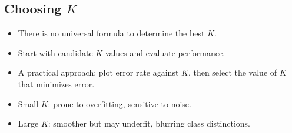 \documentclass[11pt]{article}
\begin{document}
\subsection*{Choosing $K$}
\begin{itemize}
    \item There is no universal formula to determine the best $K$.
    \item Start with candidate $K$ values and evaluate performance.
    \item A practical approach: plot error rate against $K$, then select the value of $K$ that minimizes error.
    \item Small $K$: prone to overfitting, sensitive to noise.  
    \item Large $K$: smoother but may underfit, blurring class distinctions.
\end{itemize}
\end{document}
